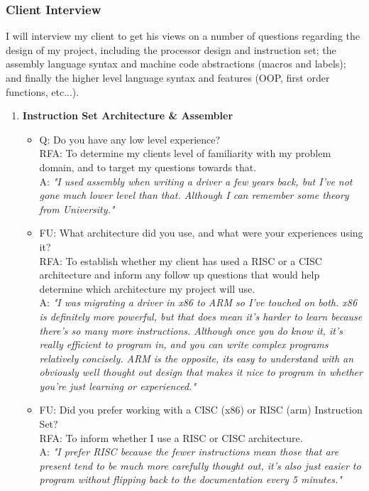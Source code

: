 \subsubsection{Client Interview}
\label{sec:Interview}
I will interview my client to get his views on a number of questions regarding the design of my project, including the processor design and instruction set; the assembly language syntax and   machine code abstractions (macros and labels); and finally the higher level language syntax and features (OOP, first order functions, etc...).  
\begin{enumerate}
    \item \textbf{Instruction Set Architecture \& Assembler}
        \begin{itemize}
            \item Q: Do you have any low level experience? \\
                RFA: To determine my clients level of familiarity with my problem domain, and to target my questions towards that.\\
                A: \textit{"I used assembly when writing a driver a few years back, but I've not gone much lower level than that. Although I can remember some theory from University."}
            \item FU: What architecture did you use, and what were your experiences using it? \\
                RFA: To establish whether my client has used a RISC or a CISC architecture and inform any follow up questions that would help determine which architecture my project will use. \\
                A: \textit{"I was migrating a driver in x86 to ARM so I've touched on both. x86 is definitely more powerful, but that does mean it's harder to learn because there's so many more instructions. Although once you do know it, it's really efficient to program in, and you can write complex programs relatively concisely. ARM is the opposite, its easy to understand with an obviously well thought out design that makes it nice to program in whether you're just learning or experienced."}
            \item FU: Did you prefer working with a CISC (x86) or RISC (arm) Instruction Set? \\
                RFA: To inform whether I use a RISC or CISC architecture.\\
                A: \textit{"I prefer RISC because the fewer instructions mean those that are present tend to be much more carefully thought out, it's also just easier to program without flipping back to the documentation every 5 minutes."}

\end{itemize}
\end{enumerate}
